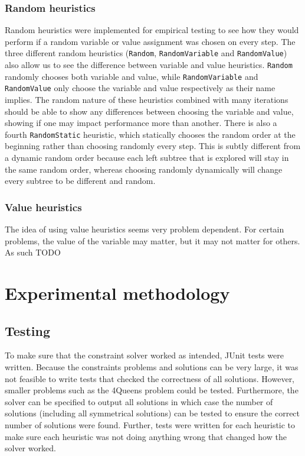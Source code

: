 \documentclass{article}
\begin{document}
\subsubsection{Random heuristics}
Random heuristics were implemented for empirical testing to see how they would perform if a random variable or value assignment was chosen on every step. The three different random heuristics (\texttt{Random}, \texttt{RandomVariable} and \texttt{RandomValue}) also allow us to see the difference between variable and value heuristics. \texttt{Random} randomly chooses both variable and value, while \texttt{RandomVariable} and \texttt{RandomValue} only choose the variable and value respectively as their name implies. The random nature of these heuristics combined with many iterations should be able to show any differences between choosing the variable and value, showing if one may impact performance more than another. There is also a fourth \texttt{RandomStatic} heuristic, which statically chooses the random order at the beginning rather than choosing randomly every step. This is subtly different from a dynamic random order because each left subtree that is explored will stay in the same random order, whereas choosing randomly dynamically will change every subtree to be different and random. 

\subsubsection{Value heuristics}
The idea of using value heuristics seems very problem dependent. For certain problems, the value of the variable may matter, but it may not matter for others. As such TODO


\section{Experimental methodology}

\subsection{Testing}
To make sure that the constraint solver worked as intended, JUnit tests were written. Because the constraints problems and solutions can be very large, it was not feasible to write tests that checked the correctness of all solutions. However, smaller problems such as the 4Queens problem could be tested. Furthermore, the solver can be specified to output all solutions in which case the number of solutions (including all symmetrical solutions) can be tested to ensure the correct number of solutions were found. 
\n
Further, tests were written for each heuristic to make sure each heuristic was not doing anything wrong that changed how the solver worked. 
\end{document}
